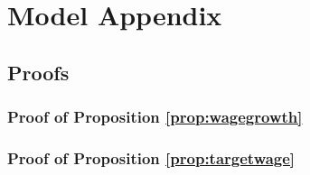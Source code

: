 \appendix
\section{Model Appendix} 
\subsection{Proofs}
\subsubsection*{Proof of Proposition \ref{prop:wagegrowth}} \label{proof:wagegrowth}
\subsubsection*{Proof of Proposition \ref{prop:targetwage}} \label{proof:targetwage}

